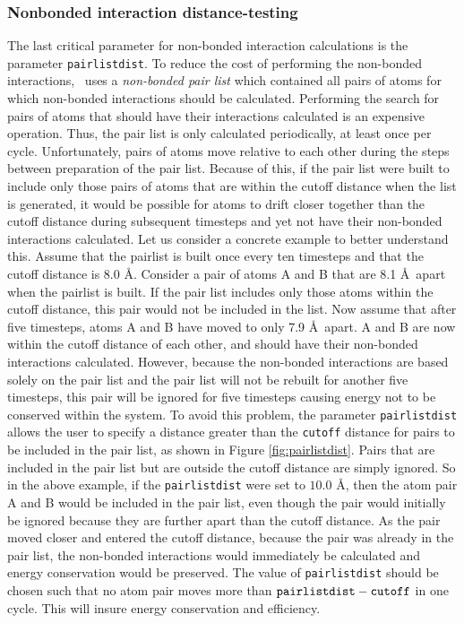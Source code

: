\subsubsection{Nonbonded interaction distance-testing}
The last critical parameter for non-bonded
interaction calculations is the parameter {\tt pairlistdist}.  To reduce the
cost of performing the non-bonded interactions, \NAMD\ uses a {\it non-bonded
pair list} which contained all pairs of atoms for which
non-bonded interactions
should be calculated.  Performing the search for pairs of atoms that
should have their interactions calculated is an expensive operation.  Thus,
the pair list is only calculated periodically, at least once per cycle.
Unfortunately,
pairs of atoms move relative to each other during the steps between preparation
of the pair list.  Because of this, if the pair list were built to include
only
those pairs of atoms that are within the cutoff distance
when the list is generated, it would
be possible 
for atoms to drift closer together
than the cutoff distance during subsequent timesteps and yet not
have their non-bonded interactions calculated.  
\prettypar
Let us consider a concrete example to better understand this.  Assume that the
pairlist is built once every ten timesteps and that the cutoff
distance is 8.0 \AA.  Consider a pair
of atoms A and B that are 8.1 \AA\ apart when the pairlist is built.
If the pair list
includes only those atoms within the cutoff distance, this pair would not
be included in the list.  Now assume that after five timesteps, atoms
A and B have moved to only 7.9 \AA\ apart.  A and B are now within the
cutoff distance of each other, and should have their
non-bonded interactions calculated.
However, because the non-bonded interactions are based solely on the pair list
and the pair list will not be rebuilt for another five timesteps, this pair
will be ignored for five timesteps causing energy not to be conserved 
within the system.  
\prettypar
To avoid this problem, the parameter {\tt pairlistdist} allows the user
to specify a distance greater than the {\tt cutoff} distance for pairs
to be included in the pair list, as shown in Figure \ref{fig:pairlistdist}.
Pairs that are included in the pair list but are outside the cutoff distance
are simply ignored.  So in the above example, if the {\tt pairlistdist}
were set to $10.0$ \AA, then 
the atom pair A and B would be included in the pair list, even though
the pair would initially be ignored because they are further apart than
the cutoff distance.  As the pair moved closer and entered the cutoff
distance, because the pair was already in the pair list, the non-bonded
interactions would immediately be calculated and energy conservation
would be preserved.  The value of {\tt pairlistdist} should be chosen
such that no atom pair moves more than 
$\mbox{{\tt pairlistdist}}-\mbox{{\tt cutoff}}$ 
in one cycle.  This will insure energy conservation and efficiency.

